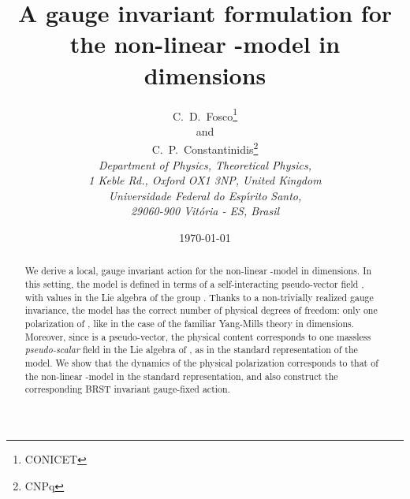 \documentclass[a4paper,12pt]{article}
\begin{document}
\title{A gauge invariant formulation for the \coordHE{} non-linear
  \myHighlight{$\sigma$}\coordHE{}-model in \coordHE{} dimensions}
\author{C.\ D.\ Fosco\coordHE{}\thanks{CONICET}\\
  and\\
  C.\ P.\ Constantinidis\coordHE{}\thanks{CNPq}\\
  {\normalsize\it {}\coordHE{}Department of Physics, Theoretical Physics,}\\
  {\normalsize\it 1 Keble Rd., Oxford OX1 3NP, United Kingdom}\\
  {\normalsize\it {}\coordHE{}Universidade Federal do Esp\'{\i}rito Santo,}\\
  {\normalsize\it 29060-900 Vit\'oria - ES, Brasil}} \date{\today}
\maketitle
\begin{abstract}
\noindent
We derive a local, gauge invariant action for the \coordHE{} non-linear
\myHighlight{$\sigma$}\coordHE{}-model in \coordHE{} dimensions. In this setting, the model is
defined in terms of a self-interacting pseudo-vector field
\myHighlight{$\theta_\mu$}\coordHE{}, with values in the Lie algebra of the group \coordHE{}.
Thanks to a non-trivially realized gauge invariance, the model has the
correct number of physical degrees of freedom: only one polarization
of \myHighlight{$\theta_\mu$}\coordHE{}, like in the case of the familiar Yang-Mills theory in
\coordHE{} dimensions.  Moreover, since \myHighlight{$\theta_\mu$}\coordHE{} is a pseudo-vector,
the physical content corresponds to one massless {\em pseudo-scalar\/}
field in the Lie algebra of \coordHE{}, as in the standard representation
of the model.  We show that the dynamics of the physical polarization
corresponds to that of the \coordHE{} non-linear \myHighlight{$\sigma$}\coordHE{}-model in the
standard representation, and also construct the corresponding BRST
invariant gauge-fixed action.
\end{abstract}
\bigskip
\end{document}
